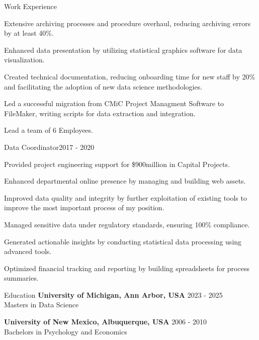 \documentclass{resume} %
\begin{document}
\begin{rSection}{Work Experience}
\begin{rSubsection}
                                    \item Extensive archiving processes and procedure overhaul, reducing archiving errors by at least 40\%.
                                    \item Enhanced data presentation by utilizing statistical graphics software for data visualization.
                                    \item Created technical documentation, reducing onboarding time for new staff by 20\% and facilitating the adoption of new data science methodologies.
                                    \item Led a successful migration from CMiC Project Managment Software to FileMaker, writing scripts for data extraction and integration.
                                    \item Lead a team of 6 Employees.
                            \end{rSubsection}
                    \begin{rSubsection}
                {Data Coordinator}{2017 - 2020}
                                    {}
                                {}
                                    \item Provided project engineering support for \$900million in Capital Projects.
                                    \item Enhanced departmental online presence by managing and building web assets.
                                    \item Improved data quality and integrity by further exploitation of existing tools to improve the most important process of my position.
                                    \item Managed sensitive data under regulatory standards, ensuring 100\% compliance.
                                    \item Generated actionable insights by conducting statistical data processing using advanced tools.
                                    \item Optimized financial tracking and reporting by building spreadsheets for process summaries.
                            \end{rSubsection}
            \end{rSection}

\begin{rSection}{Education}
                        \textbf{University of Michigan, Ann Arbor, USA} \hfill {2023 - 2025} \\
                            {Masters in Data Science}
                         
             
         
                        \textbf{University of New Mexico, Albuquerque, USA} \hfill {2006 - 2010} \\
                            {Bachelors in Psychology and Economics} 
    \end{rSection}
\end{document}
